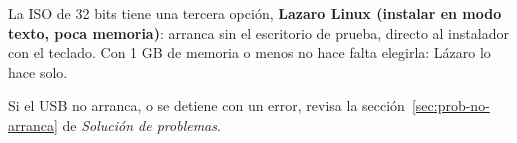 La ISO de 32 bits tiene una tercera opción, \textbf{Lazaro Linux (instalar
en modo texto, poca memoria)}: arranca sin el escritorio de prueba, directo
al instalador con el teclado. Con 1 GB de memoria o menos no hace falta
elegirla: Lázaro lo hace solo.


Si el USB no arranca, o se detiene con un error, revisa la
sección~\ref{sec:prob-no-arranca} de \emph{Solución de problemas}.

\fuentes
